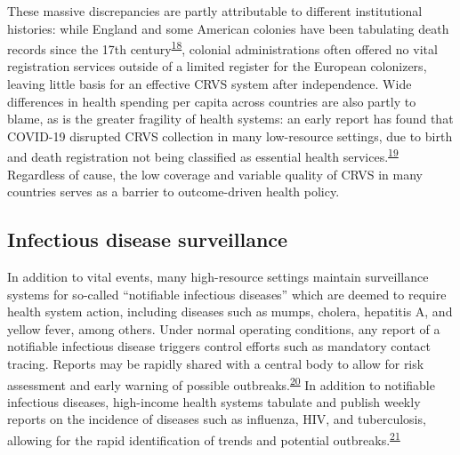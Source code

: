 \documentclass[
]{article}
\begin{document}
These massive discrepancies are partly attributable to different institutional histories: while England and some American colonies have been tabulating death records since the 17th century\textsuperscript{\protect\hyperlink{ref-Blake1955}{18}}, colonial administrations often offered no vital registration services outside of a limited register for the European colonizers, leaving little basis for an effective CRVS system after independence. Wide differences in health spending per capita across countries are also partly to blame, as is the greater fragility of health systems: an early report has found that COVID-19 disrupted CRVS collection in many low-resource settings, due to birth and death registration not being classified as essential health services.\textsuperscript{\protect\hyperlink{ref-AbouZahr2021}{19}} Regardless of cause, the low coverage and variable quality of CRVS in many countries serves as a barrier to outcome-driven health policy.

\hypertarget{infectious-disease-surveillance}{%
\subsection{Infectious disease surveillance}\label{infectious-disease-surveillance}}

In addition to vital events, many high-resource settings maintain surveillance systems for so-called ``notifiable infectious diseases'' which are deemed to require health system action, including diseases such as mumps, cholera, hepatitis A, and yellow fever, among others. Under normal operating conditions, any report of a notifiable infectious disease triggers control efforts such as mandatory contact tracing. Reports may be rapidly shared with a central body to allow for risk assessment and early warning of possible outbreaks.\textsuperscript{\protect\hyperlink{ref-Vlieg2017}{20}} In addition to notifiable infectious diseases, high-income health systems tabulate and publish weekly reports on the incidence of diseases such as influenza, HIV, and tuberculosis, allowing for the rapid identification of trends and potential outbreaks.\textsuperscript{\protect\hyperlink{ref-Thacker1989}{21}}
\end{document}
